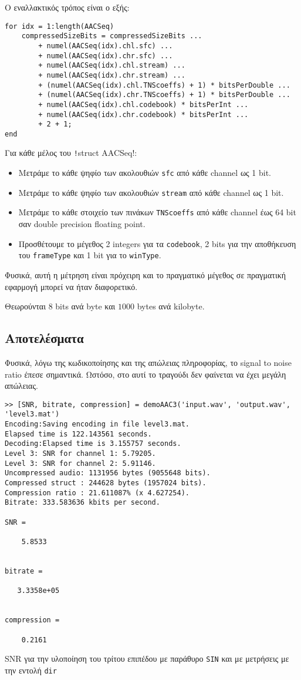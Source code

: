 Ο εναλλακτικός τρόπος είναι ο εξής:
\begin{verbatim}
for idx = 1:length(AACSeq)
    compressedSizeBits = compressedSizeBits ...
        + numel(AACSeq(idx).chl.sfc) ...
        + numel(AACSeq(idx).chr.sfc) ...
        + numel(AACSeq(idx).chl.stream) ...
        + numel(AACSeq(idx).chr.stream) ...
        + (numel(AACSeq(idx).chl.TNScoeffs) + 1) * bitsPerDouble ...
        + (numel(AACSeq(idx).chr.TNScoeffs) + 1) * bitsPerDouble ...
        + numel(AACSeq(idx).chl.codebook) * bitsPerInt ...
        + numel(AACSeq(idx).chr.codebook) * bitsPerInt ...
        + 2 + 1;
end
\end{verbatim}
Για κάθε μέλος του \texttt!struct AACSeq!:
\begin{itemize}
\item Μετράμε το κάθε ψηφίο των ακολουθιών \texttt{sfc} από κάθε channel ως 1 bit.
\item Μετράμε το κάθε ψηφίο των ακολουθιών \texttt{stream} από κάθε channel ως 1 bit.
\item Μετράμε το κάθε στοιχείο των πινάκων \texttt{TNScoeffs} από κάθε channel έως 64 bit σαν double precision floating point.
\item Προσθέτουμε το μέγεθος 2 integers για τα \texttt{codebook}, 2 bits για την αποθήκευση του \texttt{frameType} και 1 bit για το \texttt{winType}.
\end{itemize}
Φυσικά, αυτή η μέτρηση είναι πρόχειρη και το πραγματικό μέγεθος σε πραγματική εφαρμογή μπορεί να ήταν διαφορετικό.

Θεωρούνται $8$ bits ανά byte και $1000$ bytes ανά kilobyte.

\subsection{Αποτελέσματα}
Φυσικά, λόγω της κωδικοποίησης και της απώλειας πληροφορίας, το signal to noise ratio έπεσε σημαντικά.
Ωστόσο, στο αυτί το τραγούδι δεν φαίνεται να έχει μεγάλη απώλειας.

\begin{code}
\begin{verbatim}
>> [SNR, bitrate, compression] = demoAAC3('input.wav', 'output.wav', 'level3.mat')
Encoding:Saving encoding in file level3.mat.
Elapsed time is 122.143561 seconds.
Decoding:Elapsed time is 3.155757 seconds.
Level 3: SNR for channel 1: 5.79205.
Level 3: SNR for channel 2: 5.91146.
Uncompressed audio: 1131956 bytes (9055648 bits).
Compressed struct : 244628 bytes (1957024 bits).
Compression ratio : 21.611087% (x 4.627254).
Bitrate: 333.583636 kbits per second.

SNR =

    5.8533


bitrate =

   3.3358e+05


compression =

    0.2161
\end{verbatim}
\caption{SNR για την υλοποίηση του τρίτου επιπέδου με παράθυρο \texttt{SIN} και με μετρήσεις με την εντολή \texttt{dir}}
\end{code}

